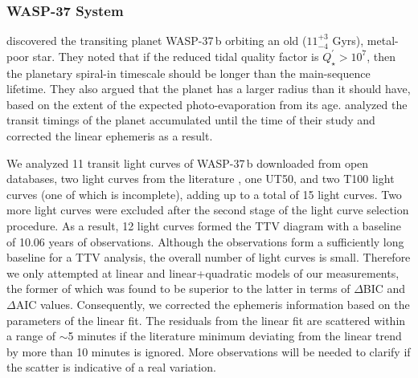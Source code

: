 \documentclass[a4paper,fleqn,usenatbib]{mnras}
\begin{document}
\subsubsection{WASP-37 System}
\citet{2011AJ....141....8S} discovered the transiting planet WASP-37\,b orbiting an old ($11^{+3}_{-4}$ Gyrs), metal-poor star. They noted that if the reduced tidal quality factor is $Q_{\star}^{\prime} > 10^7$, then the planetary spiral-in timescale should be longer than the main-sequence lifetime. They also argued that the planet has a larger radius than it should have, based on the extent of the expected photo-evaporation from its age. \citet{2019A&A...622A..81M} analyzed the transit timings of the planet accumulated until the time of their study and corrected the linear ephemeris as a result.

We analyzed 11 transit light curves of WASP-37\,b downloaded from open databases, two light curves from the literature \citep{2019A&A...622A..81M}, one UT50, and two T100 light curves (one of which is incomplete), adding up to a total of 15 light curves. Two more light curves were excluded after the second stage of the light curve selection procedure. As a result, 12 light curves formed the TTV diagram with a baseline of 10.06 years of observations. Although the observations form a sufficiently long baseline for a TTV analysis, the overall number of light curves is small. Therefore we only attempted at linear and linear+quadratic models of our measurements, the former of which was found to be superior to the latter in terms of $\Delta$BIC and $\Delta$AIC values. Consequently, we corrected the ephemeris information based on the parameters of the linear fit. The residuals from the linear fit are scattered within a range of $\sim$5 minutes if the literature minimum deviating from the linear trend by more than 10 minutes is ignored. More observations will be needed to clarify if the scatter is indicative of a real variation. 
\end{document}
